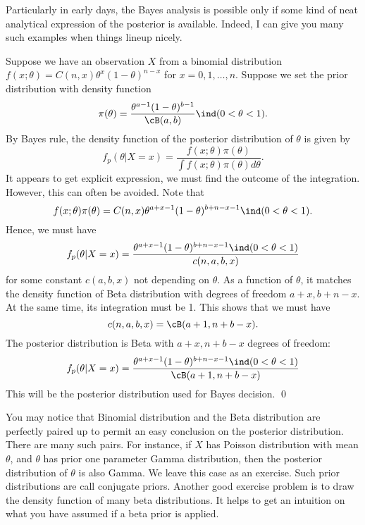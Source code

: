 Particularly in early days, the Bayes analysis is possible only if
some kind of neat analytical expression of the posterior is available.
Indeed, I can give you many such examples when things lineup nicely.

\begin{example}
Suppose we have an observation $X$ from a binomial distribution
$f(x; \theta) = C(n, x) \theta^x (1-\theta)^{n-x}$ for $x=0, 1, \ldots, n$.
Suppose we set the prior distribution with density function
\[
\pi(\theta) = \frac{\theta^{a-1} (1-\theta)^{b-1}}{\cB(a, b)}\ind(0 < \theta < 1).
\]
By Bayes rule, the density function of the posterior distribution of $\theta$
is given by
\[
f_p (\theta | X=x) 
= \frac{f(x; \theta) \pi(\theta)}{\int f(x; \theta) \pi(\theta) d\theta}.
\]
It appears to get explicit expression, we must find the outcome of
the integration. However, this can often be avoided. 
Note that
\[
f(x; \theta) \pi(\theta)
= C(n, x) \theta^{a+x - 1} (1-\theta)^{b+n- x - 1} \ind(0 < \theta < 1).
\]
Hence, we must have
\[
f_p (\theta | X=x) 
= \frac{ \theta^{a+x - 1} (1-\theta)^{b+n- x - 1} \ind(0 < \theta < 1)}{c(n, a, b, x)}
\]
for some constant $c(a, b, x)$ not depending on $\theta$.
As a function of $\theta$, it matches the density function of Beta
distribution with degrees of freedom $a+x, b+n-x$.
At the same time, its integration must be 1. This shows
that we must have
\[
c(n, a, b, x) = \cB(a+1, n+b - x).
\]
The posterior distribution is Beta with $a+x, n+b - x$
degrees of freedom:
\[
f_p (\theta | X=x) 
= \frac{ \theta^{a+x - 1} (1-\theta)^{b+n- x - 1} \ind(0 < \theta < 1)}
{\cB(a+1, n+b - x)}
\]
This will be the posterior distribution used for Bayes decision. 
\qed
\end{example}

You may notice that Binomial distribution and the Beta distribution are
perfectly paired up to permit an easy conclusion on the posterior distribution.
There are many such pairs. For instance, if $X$ has Poisson distribution
with mean $\theta$, and $\theta$ has prior one parameter Gamma distribution,
then the posterior distribution of $\theta$ is also Gamma. We leave this
case as an exercise. Such prior distributions are call conjugate priors.
Another good exercise problem is to draw the density function of many
beta distributions. It helps to get an intuition on what you have assumed
if a beta prior is applied.


